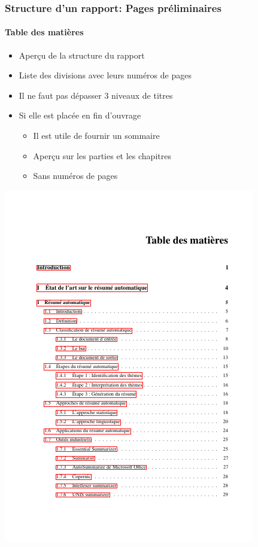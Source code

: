 \documentclass[xcolor=table]{beamer}
\begin{document}
\begin{frame}
\frametitle{Structure d'un rapport: Pages préliminaires}
\framesubtitle{Table des matières}

\begin{minipage}{0.60\textwidth}
	\begin{itemize}
		\item Aperçu de la structure du rapport
		\item Liste des divisions avec leurs numéros de pages 
		\item Il ne faut pas dépasser 3 niveaux de titres
		\item Si elle est placée en fin d'ouvrage
		\begin{itemize}
			\item Il est utile de fournir un sommaire
			\item Aperçu sur les parties et les chapitres
			\item Sans numéros de pages
		\end{itemize}
	\end{itemize}
\end{minipage}
\begin{minipage}{0.38\textwidth}
	\includegraphics[width=\textwidth,frame]{..//img/Bweb03-redaction/sommaire.png}
\end{minipage}

\end{frame}
\end{document}
